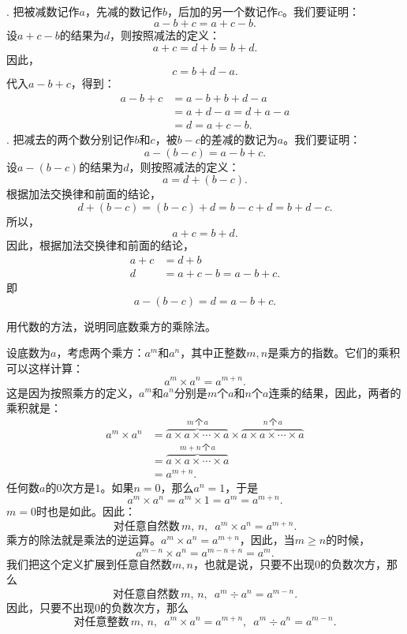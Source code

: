 \documentclass[12pt,UTF8,fontset=none]{ctexbook}
\begin{document}
\begin{so}
    \mbox{} \\
    . 把被减数记作$a$，先减的数记作$b$，后加的另一个数记作$c$。我们要证明：
    $$ a - b + c = a + c - b.$$
    设$a + c - b$的结果为$d$，则按照减法的定义：
    $$ a + c = d + b = b + d.$$
    因此，
    $$ c = b + d - a.$$
    代入$a - b + c$，得到：
    \begin{align*}
        a - b + c &= a - b + b + d - a \\
        &= a + d - a = d + a - a \tag{加法交换律} \\
        &= d = a + c - b.
    \end{align*}
    . 把减去的两个数分别记作$b$和$c$，被$b-c$的差减的数记为$a$。我们要证明：
    $$ a - (b - c) = a - b + c.$$
    设$a - (b - c)$的结果为$d$，则按照减法的定义：
    $$ a = d + (b - c).$$
    根据加法交换律和前面的结论，
    $$ d + (b - c) = (b - c) + d = b - c + d = b + d - c.$$
    所以，
    $$ a + c = b + d.$$
    因此，根据加法交换律和前面的结论，
    \begin{align*}
        a + c &= d + b \\
        d &= a + c - b = a - b + c.
    \end{align*}
    即
    $$ a - (b - c) = d = a - b + c.$$
\end{so}

\begin{et}
    用代数的方法，说明同底数乘方的乘除法。
\end{et}

\begin{so}
    设底数为$a$，考虑两个乘方：$a^m$和$a^n$，其中正整数$m,n$是乘方的指数。它们的乘积可以这样计算：
    $$ a^m \times a^n = a^{m+n}. $$
    这是因为按照乘方的定义，$a^m$和$a^n$分别是$m$个$a$和$n$个$a$连乘的结果，因此，两者的乘积就是：
    \begin{align*}
        a^m \times a^n &= \overbrace{a\times a\times \cdots \times a}^{m\,\text{个}\,a} \times \overbrace{a\times a\times \cdots \times a}^{n\,\text{个}\,a} \\
        &= \overbrace{a\times a\times \cdots \times a}^{m+n\,\text{个}\,a} \\
        &= a^{m+n}.
    \end{align*}
    任何数$a$的$0$次方是$1$。如果$n=0$，那么$a^n=1$，于是
    $$ a^m \times a^n = a^{m}\times 1 = a^m = a^{m+n}. $$
    $m=0$时也是如此。因此：
    $$ \mbox{对任意自然数}\,m,\, n, \,\,\, a^m \times a^n = a^{m+n}. $$
    乘方的除法就是乘法的逆运算。$ a^m \times a^n = a^{m+n}$，因此，当$m\geqslant n$的时候，
    $$ a^{m-n} \times a^n = a^{m-n+n} = a^m. $$
    我们把这个定义扩展到任意自然数$m,n$，也就是说，只要不出现$0$的负数次方，那么
    $$  \mbox{对任意自然数}\,m,\, n, \,\,\, a^m \div a^n = a^{m-n}. $$
    因此，只要不出现$0$的负数次方，那么
    $$  \mbox{对任意整数}\,m,\, n, \,\,\, a^m \times a^n = a^{m+n}, \,\,\, a^m \div a^n = a^{m-n}. $$
\end{so}
\end{document}
